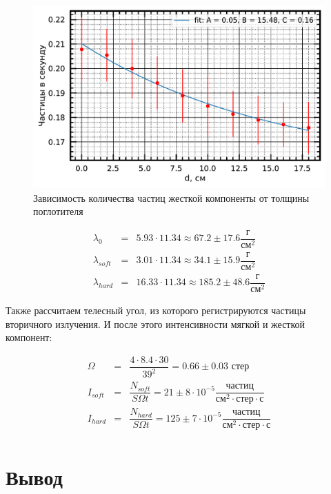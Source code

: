 \documentclass[reprint, nofootinbib, nobalancelastpage, 10pt]{revtex4-2}
\begin{document}
\begin{figure}[h!]
	\includegraphics[width=0.95\linewidth]{plot_3.pdf}
	\caption{Зависимость количества частиц жесткой компоненты от толщины поглотителя}
	\label{graph:hard}
\end{figure}

\begin{eqnarray*}
	\lambda_0 &=& 5.93 \cdot 11.34 \approx 67.2 \pm 17.6 \dfrac{\text{г}}{\text{см}^2}\\
	\lambda_{soft} &=& 3.01 \cdot 11.34 \approx 34.1 \pm 15.9 \dfrac{\text{г}}{\text{см}^2}\\
	\lambda_{hard} &=& 16.33 \cdot 11.34 \approx 185.2 \pm 48.6 \dfrac{\text{г}}{\text{см}^2}
\end{eqnarray*}

\newpage
Также рассчитаем телесный угол, из которого регистрируются частицы вторичного излучения.
И после этого интенсивности мягкой и жесткой компонент:


\begin{eqnarray*}
	\Omega &=& \dfrac{4 \cdot 8.4 \cdot 30}{39^2} = 0.66 \pm 0.03 \text{ стер} \\
	I_{soft} &=& \dfrac{N_{soft}}{S \Omega t} = 21 \pm 8 \cdot 10^{-5}
		\dfrac{\text{частиц}}{\text{см}^2 \cdot \text{стер} \cdot \text{с}} \\
	I_{hard} &=& \dfrac{N_{hard}}{S \Omega t} = 125 \pm 7 \cdot 10^{-5}
		\dfrac{\text{частиц}}{\text{см}^2 \cdot \text{стер} \cdot \text{с}} \\
\end{eqnarray*}


\section*{Вывод}
\end{document}
